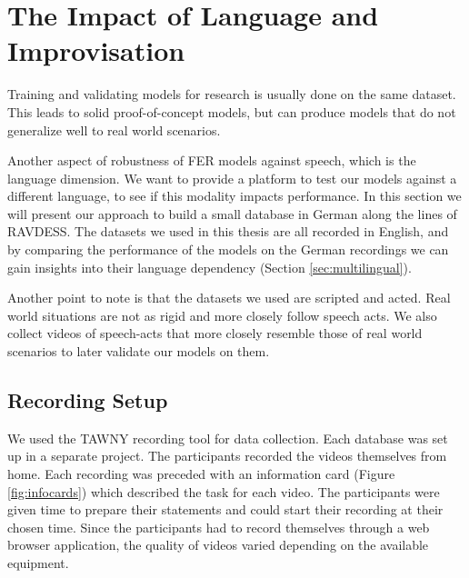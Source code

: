\newpage
\section{The Impact of Language and Improvisation}
\label{sec:data}
Training and validating models for research is usually done on the same dataset. This leads to solid proof-of-concept models, but can produce models that do not generalize well to real world scenarios. 

Another aspect of robustness of FER models against speech, which is the language dimension. We want to provide a platform to test our models against a different language, to see if this modality impacts performance. In this section we will present our approach to build a small database in German along the lines of RAVDESS. The datasets we used in this thesis are all recorded in English, and by comparing the performance of the models on the German recordings we can gain insights into their language dependency (Section \ref{sec:multilingual}). 

Another point to note is that the datasets we used are scripted and acted. Real world situations are not as rigid and more closely follow speech acts. We also collect videos of speech-acts that more closely resemble those of real world scenarios to later validate our models on them.

\subsection{Recording Setup}
We used the TAWNY recording tool \cite{tawny2021} for data collection. Each database was set up in a separate project. The participants recorded the videos themselves from home. Each recording was preceded with an information card (Figure \ref{fig:infocards}) which described the task for each video. The participants were given time to prepare their statements and could start their recording at their chosen time. Since the participants had to record themselves through a web browser application, the quality of videos varied depending on the available equipment.


